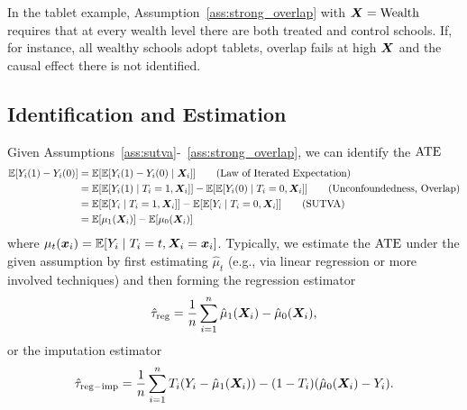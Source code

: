 \documentclass[11pt]{exam}
\begin{document}
In the tablet example, Assumption~\ref{ass:strong_overlap} with $\bm{X}=\text{Wealth}$ requires that at every wealth level there are both treated and control schools. If, for instance, all wealthy schools adopt tablets, overlap fails at high $\bm{X}$ and the causal effect there is not identified.\

\subsection{Identification and Estimation}
Given Assumptions~\ref{ass:sutva}-~\ref{ass:strong_overlap}, we can identify the $\mathrm{ATE}$
\begin{align*}
    \mathbb{E}[Y_i(1) - Y_i(0)] &= \mathbb{E}[\mathbb{E}[Y_i(1) - Y_i(0) \mid \bm{X}_i]] \qquad \text{(Law of Iterated Expectation)}
    \\
    &= \mathbb{E}[\mathbb{E}[Y_i(1) \mid T_i = 1, \bm{X}_i]] - \mathbb{E}[\mathbb{E}[Y_i(0)\mid T_i = 0, \bm{X}_i]] \qquad \text{(Unconfoundedness, Overlap)}
    \\
    &= \mathbb{E}[\mathbb{E}[Y_i \mid T_i = 1, \bm{X}_i]] - \mathbb{E}[\mathbb{E}[Y_i\mid T_i = 0, \bm{X}_i]] \qquad \text{(SUTVA)}
    \\
    &= \mathbb{E}[\mu_1(\bm{X}_i)] - \mathbb{E}[\mu_0(\bm{X}_i)]
\end{align*}
where $\mu_t(\bm{x}_i) = \mathbb{E}[Y_i \mid T_i = t, \bm{X}_i = \bm{x}_i]$. Typically, we estimate the $\mathrm{ATE}$ under the given assumption by first estimating $\hat \mu_t$ (e.g., via linear regression or more involved techniques) and then forming the regression estimator 
\[
    \hat \tau_{\mathrm{reg}} = \frac{1}{n} \sum_{i=1}^n \hat \mu_1(\bm{X}_i) - \hat \mu_0(\bm{X}_i),
\]
or the imputation estimator
\[
    \hat \tau_{\mathrm{reg-imp}} = \frac{1}{n} \sum_{i=1}^n T_i (Y_i - \hat\mu_1(\bm{X}_i)) - (1-T_i) (\hat \mu_0(\bm{X}_i) - Y_i).
\]
\end{document}

